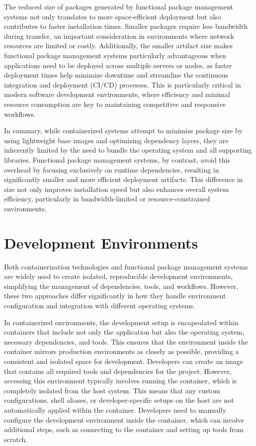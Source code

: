 The reduced size of packages generated by functional package management systems not only
translates to more space-efficient deployment but also contributes to faster installation
times. Smaller packages require less bandwidth during transfer, an important consideration
in environments where network resources are limited or costly. Additionally, the smaller
artifact size makes functional package management systems particularly advantageous when
applications need to be deployed across multiple servers or nodes, as faster deployment times
help minimize downtime and streamline the continuous integration and deployment (CI/CD)
processes. This is particularly critical in modern software development environments, where
efficiency and minimal resource consumption are key to maintaining competitive and responsive
workflows.

In summary, while containerized systems attempt to minimize package size by using lightweight
base images and optimizing dependency layers, they are inherently limited by the need to
bundle the operating system and all supporting libraries. Functional package management
systems, by contrast, avoid this overhead by focusing exclusively on runtime dependencies,
resulting in significantly smaller and more efficient deployment artifacts. This difference
in size not only improves installation speed but also enhances overall system efficiency,
particularly in bandwidth-limited or resource-constrained environments.

\section{Development Environments}
Both containerization technologies and functional package management systems are widely used
to create isolated, reproducible development environments, simplifying the management of
dependencies, tools, and workflows. However, these two approaches differ significantly in
how they handle environment configuration and integration with different operating systems.

In containerized environments, the development setup is encapsulated within containers that
include not only the application but also the operating system, necessary dependencies, and
tools. This ensures that the environment inside the container mirrors production environments
as closely as possible, providing a consistent and isolated space for development. Developers
can create an image that contains all required tools and dependencies for the project.
However, accessing this environment typically involves running the container, which is
completely isolated from the host system. This means that any custom configurations, shell
aliases, or developer-specific setups on the host are not automatically applied within the
container. Developers need to manually configure the development environment inside the
container, which can involve additional steps, such as connecting to the container and
setting up tools from scratch.

